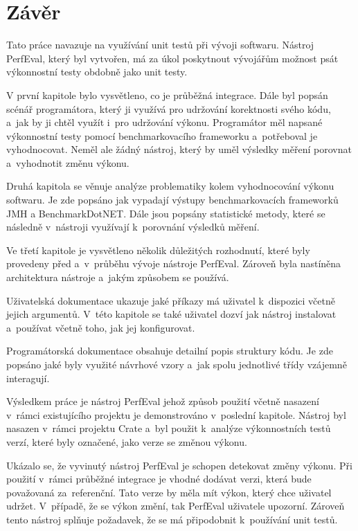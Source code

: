 \chapter{Závěr}

Tato práce navazuje na využívání unit testů při vývoji softwaru.
Nástroj PerfEval, který byl vytvořen, má za úkol poskytnout vývojářům možnost
psát výkonnostní testy obdobně jako unit testy.

V první kapitole bylo vysvětleno, co je průběžná integrace. Dále byl popsán scénář programátora, který
ji využívá pro udržování korektnosti svého kódu, a~jak by ji chtěl využít i~pro udržování výkonu.
Programátor měl napsané výkonnostní testy pomocí benchmarkovacího frameworku a~potřeboval je vyhodnocovat.
Neměl ale žádný nástroj, který by uměl výsledky měření porovnat a~vyhodnotit změnu výkonu.

Druhá kapitola se věnuje analýze problematiky kolem vyhodnocování výkonu softwaru. Je zde popsáno jak vypadají výstupy benchmarkovacích frameworků
JMH a BenchmarkDotNET. Dále jsou popsány statistické metody, které se následně v~nástroji využívají k~porovnání
výsledků měření.

Ve třetí kapitole je vysvětleno několik důležitých rozhodnutí, které byly provedeny před a~v~průběhu vývoje nástroje PerfEval.
Zároveň byla nastíněna architektura nástroje a~jakým způsobem se používá.

Uživatelská dokumentace ukazuje jaké příkazy má uživatel k~dispozici včetně jejich argumentů.
V~této kapitole se také uživatel dozví jak nástroj instalovat a~používat včetně toho, jak jej konfigurovat.

Programátorská dokumentace obsahuje detailní popis struktury kódu. Je zde popsáno jaké byly využité návrhové vzory
a~jak spolu jednotlivé třídy vzájemně interagují.

Výsledkem práce je nástroj PerfEval jehož způsob použití včetně nasazení v~rámci existujícího projektu je demonstrováno
v~poslední kapitole. Nástroj byl nasazen v~rámci projektu Crate a~byl použit k~analýze výkonnostních testů verzí, které byly
označené, jako verze se změnou výkonu.

Ukázalo se, že vyvinutý nástroj PerfEval je schopen detekovat změny výkonu. Při použití v~rámci
průběžné integrace je vhodné dodávat verzi, která bude považovaná za~referenční. Tato verze by měla
mít výkon, který chce uživatel udržet. V~případě, že se výkon změní, tak PerfEval uživatele upozorní.
Zároveň tento nástroj splňuje požadavek, že se má připodobnit k~používání unit testů.

